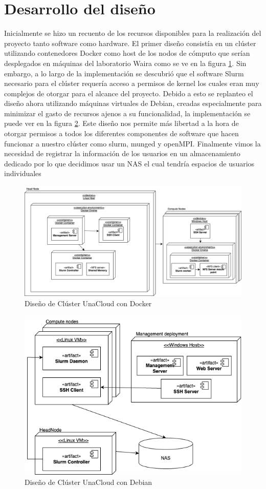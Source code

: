 \section{Desarrollo del diseño}
Inicialmente se hizo un recuento de los recursos disponibles para la realización del proyecto tanto software como hardware. El primer diseño consistía en un clúster utilizando contenedores Docker como host de los nodos de cómputo que serían desplegados en máquinas del laboratorio Waira como se ve en la figura \ref{fig:minihypatia}. Sin embargo, a lo largo de la implementación se descubrió que el software Slurm necesario para el clúster requería acceso a permisos de kernel los cuales eran muy complejos de otorgar para el alcance del proyecto. Debido a esto se replanteo el diseño ahora utilizando máquinas virtuales de Debian, creadas especialmente para minimizar el gasto de recursos ajenos a su funcionalidad, la implementación se puede ver en la figura \ref{fig:minihypatiadeb}. Este diseño nos permite más libertad a la hora de otorgar permisos a todos los diferentes componentes de software que hacen funcionar a nuestro clúster como slurm, munged y openMPI. Finalmente vimos la necesidad de registrar la información de los usuarios en un almacenamiento dedicado por lo que decidimos usar un NAS el cual tendría espacios de usuarios individuales

\begin{figure}[H]
    \centering
    \includegraphics[width=0.75\linewidth]{Documento Final/Imagenes/MiniHypatia(1)-General Deployment.png}
    \caption{Diseño de Clúster UnaCloud con Docker}
    \label{fig:minihypatia}
\end{figure}

\begin{figure}[H]
    \centering
    \includegraphics[width=0.75\linewidth]{Documento Final/Imagenes/dep.drawio.png}
    \caption{Diseño de Clúster UnaCloud con Debian}
    \label{fig:minihypatiadeb}
\end{figure}

